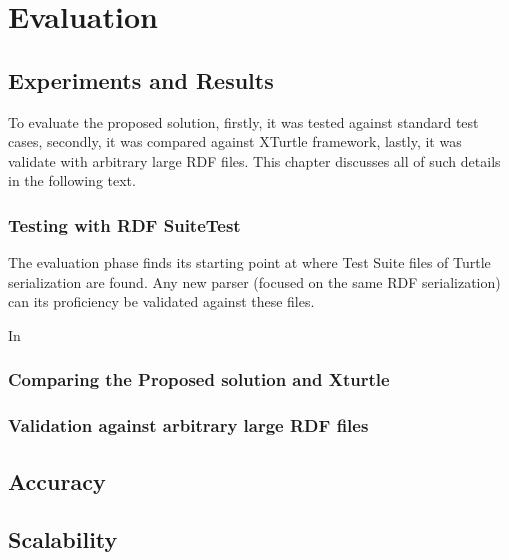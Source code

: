 \chapter{Evaluation}
\label{ch:evaluation}


\section{Experiments and Results}
To evaluate the proposed solution, firstly, it was tested against standard test cases, secondly, it was compared against XTurtle framework, lastly, it was validate with arbitrary large RDF files. This chapter discusses all of such details in the following text. 


\subsection{Testing with RDF SuiteTest}
The evaluation phase finds its starting point at \citealp{TurtleTests:Online} where Test Suite files of Turtle serialization are found. Any new parser (focused on the same RDF serialization) can its proficiency be validated against these files. 

In  \citealp{TurtleTests:Online}      
\subsection{Comparing the Proposed solution and Xturtle}
\subsection{Validation against arbitrary large RDF files }

\section{Accuracy}

\section{Scalability}








